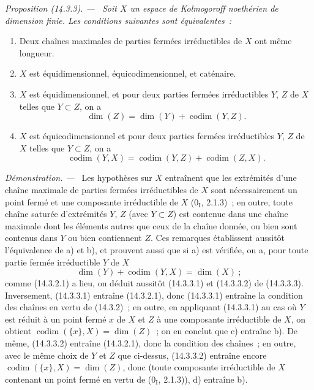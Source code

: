 \documentclass[10pt,oneside]{book}
\makeatletter
\newcommand{\setmanualcurrentlabel}[1]{\def\@currentlabel{#1}}
\newenvironment{proposition}[1][]{%
  \setmanualcurrentlabel{#1}\par\medskip\noindent\itshape Proposition (#1). ---\ }{\par}
\newenvironment{proof}{%
  \par\medskip\noindent\textit{Démonstration. ---\ }}{\par}
\makeatother
\begin{document}
\begin{proposition}[14.3.3]
\label{0.14.3.3-fr}
Soit $X$ un espace de Kolmogoroff noethérien de dimension finie. Les
conditions suivantes sont équivalentes~:
\begin{enumerate}
  \item[\rm(a)] Deux chaînes maximales de parties fermées irréductibles de $X$
  ont même longueur.
  \item[\rm(b)] $X$ est équidimensionnel, équicodimensionnel, et caténaire.
  \item[\rm(c)] $X$ est équidimensionnel, et pour deux parties fermées
  irréductibles $Y$, $Z$ de $X$ telles que $Y\subset Z$, on a
  \[
    \dim(Z)=\dim(Y)+\operatorname{codim}(Y,Z).
    \tag{14.3.3.1}\label{0.14.3.3.1-fr}
  \]
  \item[\rm(d)] $X$ est équicodimensionnel et pour deux parties fermées
  irréductibles $Y$, $Z$ de $X$ telles que $Y\subset Z$, on a
  \[
    \operatorname{codim}(Y,X)=
    \operatorname{codim}(Y,Z)+\operatorname{codim}(Z,X).
    \tag{14.3.3.2}\label{0.14.3.3.2-fr}
  \]
\end{enumerate}
\end{proposition}

\begin{proof}
Les hypothèses sur $X$ entraînent que les extrémités d'une chaîne maximale de
parties fermées irréductibles de $X$ sont nécessairement un point fermé et
une composante irréductible de $X$ ($0_{\mathrm I}$, 2.1.3)~; en outre, toute
chaîne saturée d'extrémités $Y$, $Z$ (avec $Y\subset Z$) est contenue dans une
chaîne maximale dont les éléments autres que ceux de la chaîne donnée, ou
bien sont contenus dans $Y$ ou bien contiennent $Z$. Ces remarques
établissent aussitôt l'équivalence de a) et b), et prouvent aussi que si a)
est vérifiée, on a, pour toute partie fermée irréductible $Y$ de $X$
\[
  \dim(Y)+\operatorname{codim}(Y,X)=\dim(X)~;
  \tag{14.3.3.3}\label{0.14.3.3.3-fr}
\]
comme (14.3.2.1) a lieu, on déduit aussitôt (14.3.3.1) et (14.3.3.2) de
(14.3.3.3). Inversement, (14.3.3.1) entraîne (14.3.2.1), donc (14.3.3.1)
entraîne la condition des chaînes en vertu de (14.3.2)~; en outre, en
appliquant (14.3.3.1) au cas où $Y$ est réduit à un point fermé $x$ de $X$ et
$Z$ à une composante irréductible de $X$, on obtient
$\operatorname{codim}(\{x\},X)=\dim(Z)$~; on en conclut que c) entraîne b).
De même, (14.3.3.2) entraîne (14.3.2.1), donc la condition des chaînes~; en
outre, avec le même choix de $Y$ et $Z$ que ci-dessus, (14.3.3.2) entraîne
encore $\operatorname{codim}(\{x\},X)=\dim(Z)$, donc (toute composante
irréductible de $X$ contenant un point fermé en vertu de ($0_{\mathrm I}$,
2.1.3)), d) entraîne b).
\end{proof}
\end{document}
